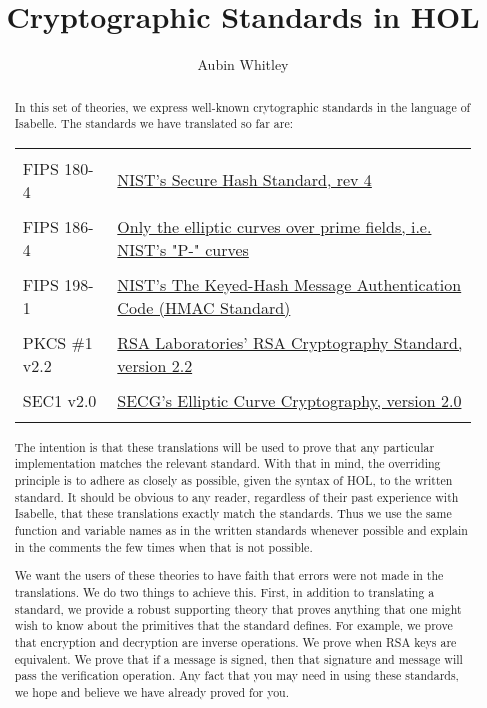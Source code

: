 \documentclass{article}
\begin{document}
	
	\title{Cryptographic Standards in HOL}
	\author{Aubin Whitley}
	\maketitle
	
	\begin{abstract}
		
		In this set of theories, we express well-known crytographic standards in the language of Isabelle.  The standards we have translated so far are:
		
		\begin{tabular}{l l}
		&\\
		FIPS 180-4 & \href{https://nvlpubs.nist.gov/nistpubs/FIPS/NIST.FIPS.180-4.pdf}{NIST's Secure Hash Standard, rev 4} \\
		&\\
		FIPS 186-4	&  \href{https://nvlpubs.nist.gov/nistpubs/FIPS/NIST.FIPS.186-4.pdf}{Only the elliptic curves over prime fields, i.e. NIST's "P-" curves}\\
		&\\
		FIPS 198-1	&  \href{https://nvlpubs.nist.gov/nistpubs/FIPS/NIST.FIPS.198-1.pdf} {NIST's The Keyed-Hash Message Authentication Code (HMAC Standard)} \\
		&\\
		PKCS \#1 v2.2	& 
		\href{https://www.rfc-editor.org/rfc/rfc8017}{RSA Laboratories' RSA Cryptography Standard, version 2.2}  \\
		& \\
		SEC1 v2.0	&  \href{https://www.secg.org/sec1-v2.pdf}{SECG's Elliptic Curve Cryptography, version 2.0}\\
		&\\
		\end{tabular}
		
		The intention is that these translations will be used to prove that any particular implementation matches the relevant standard.  With that in mind, the overriding principle is to adhere as closely as possible, given the syntax of HOL, to the written standard.  It should be obvious to any reader, regardless of their past experience with Isabelle, that these translations exactly match the  standards.  Thus we use the same function and variable names as in the written standards whenever possible and explain in the comments the few times when that is not possible.  
		
		We want the users of these theories to have faith that errors were not made in the translations. We do two things to achieve this.  First, in addition to translating a standard, we provide a robust supporting theory that proves anything that one might wish to know about the primitives that the standard defines.  For example, we prove that encryption and decryption are inverse  operations.  We prove when RSA keys are equivalent.  We prove that if a message is signed, then that signature and message will pass the verification operation.  Any fact that you may need in using these standards, we hope and believe we have already proved for you.  
		

\end{abstract}
\end{document}
